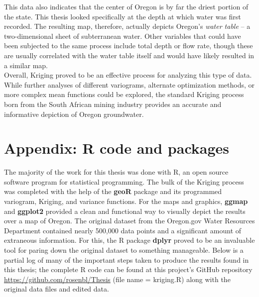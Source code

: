 \documentclass[12pt,twoside]{reedthesis}
\begin{document}
This data also indicates that the center of Oregon is by far the driest portion of the state. This thesis looked specifically at the depth at which water was first recorded. The resulting map, therefore, actually depicts Oregon's \emph{water table} -- a two-dimensional sheet of subterranean water. Other variables that could have been subjected to the same process include total depth or flow rate, though these are usually correlated with the water table itself and would have likely resulted in a similar map. \\

Overall, Kriging proved to be an effective process for analyzing this type of data. While further analyses of different variograms, alternate optimization methods, or more complex mean functions could be explored, the standard Kriging process born from the South African mining industry provides an accurate and informative depiction of Oregon groundwater.


    \appendix
      
     \chapter*{Appendix: R code and packages}


The majority of the work for this thesis was done with R, an open source software program for statistical programming. The bulk of the Kriging process was completed with the help of the \textbf{geoR} package \cite{geoR} and its programmed variogram, Kriging, and variance functions. For the maps and graphics, \textbf{ggmap} \cite{ggmap} and \textbf{ggplot2} \cite{ggplot2} provided a clean and functional way to visually depict the results over a map of Oregon. The original dataset from the Oregon.gov Water Resources Department contained nearly 500,000 data points and a significant amount of extraneous information. For this, the R package \textbf{dplyr} \cite{dplyr} proved to be an invaluable tool for paring down the original dataset to something manageable. Below is a partial log of many of the important steps taken to produce the results found in this thesis; the complete R code can be found at this project's GitHub repository \url{https://github.com/rosenbl/Thesis} (file name = kriging.R) along with the original data files and edited data. \\
\end{document}
